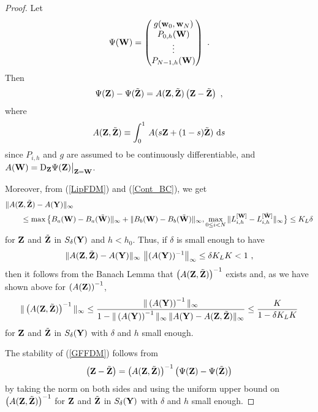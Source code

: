 \begin{proof}
Let
\begin{equation} \label{big_psi}
\Psi(\mathbf{W}) =\begin{pmatrix}
g(\mathbf{w}_0,\mathbf{w}_N) \\
P_{0,h}(\mathbf{W}) \\
\vdots \\
P_{N-1,h}(\mathbf{W}) \\
\end{pmatrix} \ .
\end{equation}
Then
\begin{equation} \label{FDM_int}
\Psi(\mathbf{Z}) - \Psi(\tilde{\mathbf{Z}}) = A(\mathbf{Z},\tilde{\mathbf{Z}})
\left(\mathbf{Z} - \tilde{\mathbf{Z}} \right) \ ,
\end{equation}
where
\[
A(\mathbf{Z}, \tilde{\mathbf{Z}}) \equiv \int_0^1\,
A(s \mathbf{Z} + (1-s)\tilde{\mathbf{Z}})\,\,\mathrm{d}s
\]
since $P_{i,h}$ and $g$ are assumed to be continuously
differentiable, and
$\displaystyle A(\mathbf{W})
= \mathrm{D}_{\mathbf{Z}} \Psi(\mathbf{Z})\big|_{\mathbf{Z} = \mathbf{W}}$.

Moreover, from (\ref{LipFDM}) and (\ref{Cont_BC}), we get
\begin{align*}
&\| A(\mathbf{Z},\tilde{\mathbf{Z}}) - A(\mathbf{Y}) \|_\infty \\
&\qquad \leq
\max \big\{ B_a(\mathbf{W}) - B_a(\tilde{\mathbf{W}}) \|_\infty +
\| B_b(\mathbf{W}) - B_b(\tilde{\mathbf{W}}) \|_\infty,
\max_{0\leq i <N}
\| L^{[\mathbf{W}]}_{i,h} - L^{[\tilde{\mathbf{W}}]}_{i,h} \|_\infty \big\}
\leq K_L \delta
\end{align*}
for $\mathbf{Z}$ and $\tilde{\mathbf{Z}}$ in
$S_\delta(\mathbf{Y})$ and $h<h_0$.  Thus, if $\delta$ is small enough to have
\[
  \| A(\mathbf{Z},\tilde{\mathbf{Z}}) - A(\mathbf{Y}) \|_\infty\,
\left\|(A(\mathbf{Y}))^{-1}\right\|_\infty
\leq \delta K_L K < 1 \ ,
\]
then it follows from the Banach Lemma that
$\displaystyle \left(A(\mathbf{Z},\tilde{\mathbf{Z}})\right)^{-1}$
exists and, as we have shown above for $\left(A(\mathbf{Z})\right)^{-1}$,
\[
\| \left(A(\mathbf{Z},\tilde{\mathbf{Z}})\right)^{-1} \|_\infty \leq
\frac{\|\left(A(\mathbf{Y})\right)^{-1}\|_\infty}
{1-\|\left(A(\mathbf{Y})\right)^{-1}\|_\infty\,
\|A(\mathbf{Y}) - A(\mathbf{Z},\tilde{\mathbf{Z}})\|_\infty}
\leq \frac{K}{1-\delta K_L K}
\]
for $\mathbf{Z}$ and $\tilde{\mathbf{Z}}$ in $S_\delta(\mathbf{Y})$
with $\delta$ and $h$ small enough.

The stability of (\ref{GFFDM}) follows from
\[
\left(\mathbf{Z} - \tilde{\mathbf{Z}} \right) =
\left(A(\mathbf{Z},\tilde{\mathbf{Z}})\right)^{-1}
\left( \Psi(\mathbf{Z}) - \Psi(\tilde{\mathbf{Z}}) \right)
\]
by taking the norm on both sides and using the uniform upper bound on
$\left(A(\mathbf{Z},\tilde{\mathbf{Z}})\right)^{-1}$ for 
$\mathbf{Z}$ and $\tilde{\mathbf{Z}}$ in $S_\delta(\mathbf{Y})$
with $\delta$ and $h$ small enough.
\end{proof}

